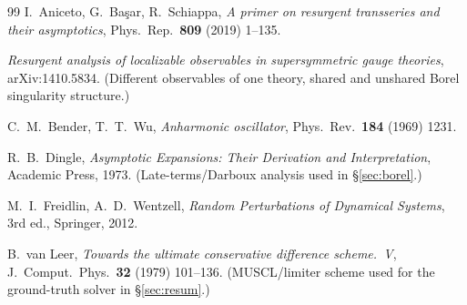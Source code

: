 \documentclass[11pt,reqno]{amsart}
\theoremstyle{plain}
\theoremstyle{definition}
\theoremstyle{remark}
\begin{document}
\begin{thebibliography}{99}
 I.~Aniceto, G.~Ba\c sar, R.~Schiappa, \emph{A primer on resurgent
transseries and their asymptotics}, Phys.\ Rep.\ \textbf{809} (2019) 1--135.

 \emph{Resurgent analysis of localizable observables in supersymmetric
gauge theories}, arXiv:1410.5834. (Different observables of one theory, shared and unshared Borel
singularity structure.)

 C.~M.~Bender, T.~T.~Wu, \emph{Anharmonic oscillator}, Phys.~Rev.~\textbf{184}
(1969) 1231.

 R.~B.~Dingle, \emph{Asymptotic Expansions: Their Derivation and Interpretation},
Academic Press, 1973. (Late-terms/Darboux analysis used in \S\ref{sec:borel}.)

 M.~I.~Freidlin, A.~D.~Wentzell, \emph{Random Perturbations of Dynamical Systems},
3rd ed., Springer, 2012.

 B.~van Leer, \emph{Towards the ultimate conservative difference scheme.~V},
J.~Comput.~Phys.~\textbf{32} (1979) 101--136. (MUSCL/limiter scheme used for the ground-truth
solver in \S\ref{sec:resum}.)

\end{thebibliography}
\end{document}
